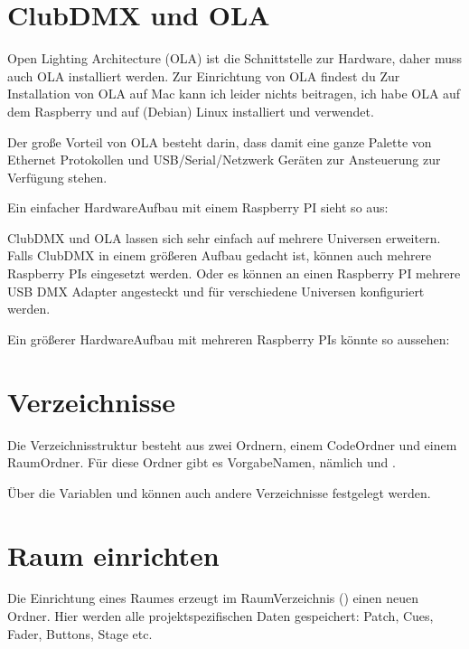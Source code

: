 \documentclass[letterpaper,10pt,ngerman]{sphinxmanual}
\begin{document}
\section{ClubDMX und OLA}
\label{\detokenize{einrichten:clubdmx-und-ola}}
Open Lighting Architecture (OLA) ist die Schnittstelle zur Hardware,
daher muss auch OLA installiert werden. Zur Einrichtung von OLA
findest du
Zur Installation von OLA auf Mac kann ich leider
nichts beitragen, ich habe OLA auf dem Raspberry und auf (Debian) Linux
installiert und verwendet.

Der große Vorteil von OLA besteht darin, dass damit eine ganze Palette
von Ethernet Protokollen und USB/Serial/Netzwerk Geräten zur
Ansteuerung zur Verfügung stehen.

Ein einfacher Hardware\sphinxhyphen{}Aufbau mit einem Raspberry PI sieht so aus:

\noindent{}

ClubDMX und OLA lassen sich sehr einfach auf mehrere Universen erweitern.
Falls ClubDMX in einem größeren Aufbau gedacht ist, können auch mehrere
Raspberry PIs eingesetzt werden. Oder es können an einen Raspberry PI
mehrere USB DMX Adapter angesteckt und für verschiedene Universen
konfiguriert werden.

Ein größerer Hardware\sphinxhyphen{}Aufbau mit mehreren Raspberry PIs könnte so aussehen:

\noindent{}


\section{Verzeichnisse}
\label{\detokenize{einrichten:verzeichnisse}}
Die Verzeichnisstruktur besteht aus zwei Ordnern, einem Code\sphinxhyphen{}Ordner und
einem Raum\sphinxhyphen{}Ordner. Für diese Ordner gibt es Vorgabe\sphinxhyphen{}Namen, nämlich
 und  .

Über die \sphinxhyphen{}Variablen  und 
können auch andere Verzeichnisse festgelegt werden.


\section{Raum einrichten}
\label{\detokenize{einrichten:raum-einrichten}}\label{\detokenize{einrichten:roomsetup}}
Die Einrichtung eines Raumes erzeugt im Raum\sphinxhyphen{}Verzeichnis ()
einen neuen Ordner. Hier werden alle projektspezifischen Daten gespeichert:
Patch, Cues, Fader, Buttons, Stage etc.
\end{document}
